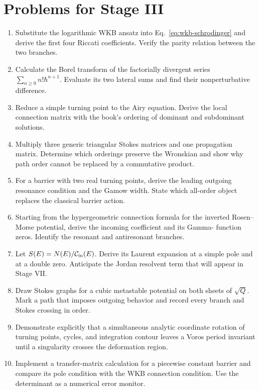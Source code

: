 \section{Problems for Stage III}
\label{problems:stage-III}

\begin{enumerate}[label=\textbf{III.\arabic*},leftmargin=*]
  \item Substitute the logarithmic WKB ansatz into
  Eq.~\eqref{eq:wkb-schrodinger} and derive the first four Riccati
  coefficients.  Verify the parity relation between the two branches.

  \item Calculate the Borel transform of the factorially divergent series
  $\sum_{n\geq0}n!\hbar^{n+1}$.  Evaluate its two lateral sums and find their
  nonperturbative difference.

  \item Reduce a simple turning point to the Airy equation.  Derive the local
  connection matrix with the book's ordering of dominant and subdominant
  solutions.

  \item Multiply three generic triangular Stokes matrices and one propagation
  matrix.  Determine which orderings preserve the Wronskian and show why path
  order cannot be replaced by a commutative product.

  \item For a barrier with two real turning points, derive the leading
  outgoing resonance condition and the Gamow width.  State which all-order
  object replaces the classical barrier action.

  \item Starting from the hypergeometric connection formula for the inverted
  Rosen--Morse potential, derive the incoming coefficient and its Gamma-
  function zeros.  Identify the resonant and antiresonant branches.

  \item Let $S(E)=N(E)/\mathcal{C}_{\mathrm{in}}(E)$.  Derive its Laurent expansion
  at a simple pole and at a double zero.  Anticipate the Jordan resolvent term
  that will appear in Stage VII.

  \item Draw Stokes graphs for a cubic metastable potential on both sheets of
  $\sqrt{Q}$.  Mark a path that imposes outgoing behavior and record every
  branch and Stokes crossing in order.

  \item Demonstrate explicitly that a simultaneous analytic coordinate
  rotation of turning points, cycles, and integration contour leaves a Voros
  period invariant until a singularity crosses the deformation region.

  \item Implement a transfer-matrix calculation for a piecewise constant
  barrier and compare its pole condition with the WKB connection condition.
  Use the determinant as a numerical error monitor.
\end{enumerate}
